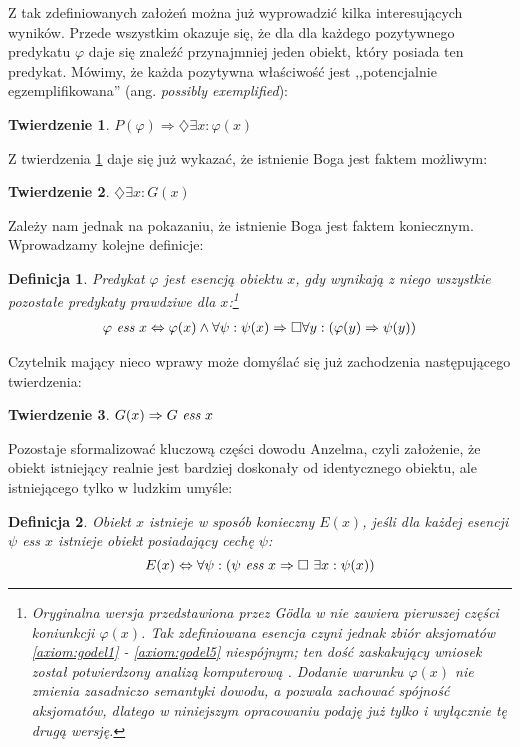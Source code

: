 \documentclass[
	runningheads
]{llncs}
\newtheorem{theorem-pl}{Twierdzenie}
\newtheorem{definition-pl}{Definicja}
\begin{document}
\noindent Z tak zdefiniowanych założeń można już wyprowadzić kilka interesujących wyników. Przede wszystkim okazuje się, że dla dla każdego pozytywnego predykatu $\varphi$ daje się znaleźć przynajmniej jeden obiekt, który posiada ten predykat. Mówimy, że każda pozytywna właściwość jest ,,potencjalnie egzemplifikowana'' (ang. \emph{possibly exemplified}):
\begin{theorem-pl} \label{th:godel1}
	$P(\varphi) \Rightarrow \diamondsuit \exists x: \varphi(x)$
\end{theorem-pl}
\noindent Z twierdzenia \ref{th:godel1} daje się już wykazać, że istnienie Boga jest faktem możliwym:
\begin{theorem-pl} \label{th:godel2}
	$\diamondsuit \exists x: G(x)$
\end{theorem-pl}
\noindent Zależy nam jednak na pokazaniu, że istnienie Boga jest faktem koniecznym. Wprowadzamy kolejne definicje:
\begin{definition-pl} \label{def:godel-essence}
	Predykat $\varphi$ jest \emph{esencją} obiektu $x$, gdy wynikają z niego wszystkie pozostałe predykaty prawdziwe dla $x$:\footnote{Oryginalna wersja przedstawiona przez G\"odla w \cite{goedel2004} nie zawiera pierwszej części koniunkcji $\varphi(x)$. Tak zdefiniowana esencja czyni jednak zbiór aksjomatów \ref{axiom:godel1} - \ref{axiom:godel5} niespójnym; ten dość zaskakujący wniosek został potwierdzony analizą komputerową \cite{benzmuller2014}. Dodanie warunku $\varphi(x)$ nie zmienia zasadniczo semantyki dowodu, a pozwala zachować spójność aksjomatów, dlatego w niniejszym opracowaniu podaję już tylko i wyłącznie tę drugą wersję.}
	\begin{align*}
	\varphi\ \emph{ess}\ x \Leftrightarrow \varphi(x) \wedge \forall \psi:
	\psi(x) \Rightarrow \Box \forall y: \left( \varphi(y) \Rightarrow \psi(y) \right)
	\end{align*}
\end{definition-pl}
\noindent Czytelnik mający nieco wprawy może domyślać się już zachodzenia następującego twierdzenia:
\begin{theorem-pl} \label{th:godel3}
	$G(x) \Rightarrow G\ \emph{ess}\ x$
\end{theorem-pl}
\noindent Pozostaje sformalizować kluczową części dowodu Anzelma, czyli założenie, że obiekt istniejący realnie jest bardziej doskonały od identycznego obiektu, ale istniejącego tylko w ludzkim umyśle: 
\begin{definition-pl} \label{def:godel-existence}
	Obiekt $x$ istnieje w sposób konieczny $E(x)$, jeśli dla każdej esencji $\psi$ \emph{ess} $x$ istnieje obiekt posiadający cechę $\psi$:
	\begin{equation*}
	E(x) \Leftrightarrow \forall \psi: \left( \psi\ \emph{ess}\ x \Rightarrow\Box\ \exists x: \psi(x) \right)
	\end{equation*}
\end{definition-pl}
\end{document}
